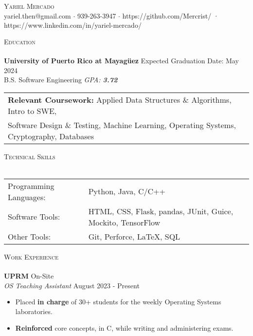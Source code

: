\documentclass[a4paper]{article}
\newcommand{\lineunder} {
    \vspace*{-8pt} \\
    \hspace*{-18pt} \hrulefill \\
}
\newcommand{\header} [1] {
    {\hspace*{-18pt}\vspace*{6pt} \textsc{#1}}
    \vspace*{-6pt} \lineunder
}
\begin{document}
\vspace*{-40pt}

    

\vspace*{-10pt}
\begin{center}
	{\Huge \scshape {Yariel Mercado}}\\
	yariel.then@gmail.com $\cdot$ 939-263-3947 $\cdot$ https://github.com/Mercrist/ · https://www.linkedin.com/in/yariel-mercado/\\
\end{center}

\header{Education}
\textbf{University of Puerto Rico at Mayagüez} \hfill Expected Graduation Date: May 2024\\	
B.S. Software Engineering \textit{GPA: \bf{3.72}} 

\vspace{2mm}
\begin{tabular}{ l l }
	\textbf{Relevant Coursework:} Applied Data Structures \& Algorithms, Intro to SWE, \\ Software Design \& Testing, Machine Learning, Operating Systems, Cryptography, Databases 
\vspace{2mm}
\end{tabular}

\header{Technical Skills}
\begin{tabular}{ l l }
	Programming Languages: & Python, Java, C/C++    \\
	Software Tools: & HTML, CSS, Flask, pandas, JUnit, Guice, Mockito, TensorFlow \\
	Other Tools:   & Git, Perforce, \LaTeX{}, SQL \\
	
\end{tabular}
\vspace{2mm}

\header{Work Experience}
\vspace{-1mm}
\textbf{UPRM} \hfill On-Site\\

\textit{OS Teaching Assistant} \hfill August 2023 - Present \\
\vspace{-2mm}
\begin{itemize} \itemsep -1pt
	\item Placed \textbf{in charge} of 30+ students for the weekly Operating Systems laboratories.
	\item \textbf{Reinforced} core concepts, in C, while writing and administering exams.
\end{itemize}
\vspace{-2mm}
\end{document}
